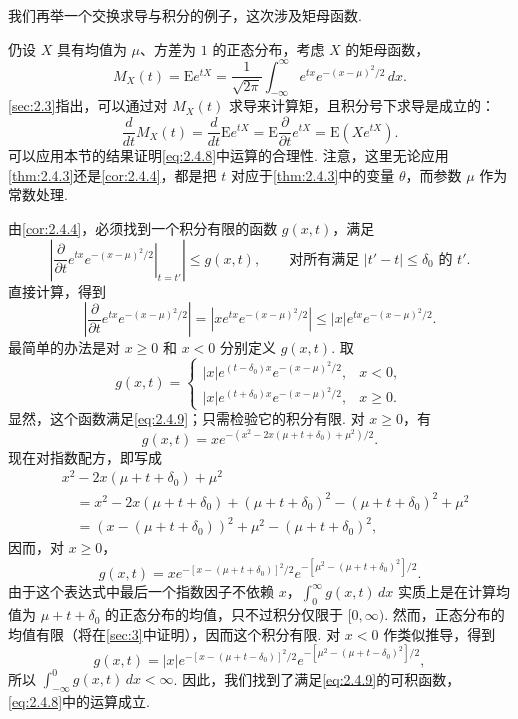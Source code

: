 我们再举一个交换求导与积分的例子，这次涉及矩母函数.
\begin{example}[交换积分与求导——II]\label{ex:2.4.6}
仍设 $X$ 具有均值为 $\mu$、方差为 $1$ 的正态分布，考虑 $X$ 的矩母函数，
$$M_X(t)=\mathrm Ee^{tX}=\frac1{\sqrt{2\pi}}\int_{-\infty}^\infty e^{tx}e^{-(x-\mu)^2/2}\,dx.$$
\autoref{sec:2.3}指出，可以通过对 $M_X(t)$ 求导来计算矩，且积分号下求导是成立的：
\begin{equation}\label{eq:2.4.8}
\frac d{dt}M_X(t)=\frac d{dt}\mathrm Ee^{tX}
=\mathrm E\frac\partial{\partial t}e^{tX}=\mathrm E(Xe^{tX}).
\end{equation}
可以应用本节的结果证明\eqref{eq:2.4.8}中运算的合理性. 注意，这里无论应用\autoref{thm:2.4.3}还是\autoref{cor:2.4.4}，都是把 $t$ 对应于\autoref{thm:2.4.3}中的变量 $\theta$，而参数 $\mu$ 作为常数处理.

由\autoref{cor:2.4.4}，必须找到一个积分有限的函数 $g(x,t)$，满足
\begin{equation}\label{eq:2.4.9}
\left|\left.\frac\partial{\partial t}e^{tx}e^{-(x-\mu)^2/2}\right|_{t=t'}\right|
\le g(x,t),\qquad\text{对所有满足 $|t'-t|\le\delta_0$ 的 $t'$}.
\end{equation}
直接计算，得到
$$\left|\frac\partial{\partial t}e^{tx}e^{-(x-\mu)^2/2}\right|
=\left|xe^{tx}e^{-(x-\mu)^2/2}\right|
\le|x|e^{tx}e^{-(x-\mu)^2/2}.$$
最简单的办法是对 $x\ge0$ 和 $x<0$ 分别定义 $g(x,t)$. 取
$$g(x,t)=\begin{cases}
|x|e^{(t-\delta_0)x}e^{-(x-\mu)^2/2},&x<0,\\
|x|e^{(t+\delta_0)x}e^{-(x-\mu)^2/2},&x\ge0.
\end{cases}$$
显然，这个函数满足\eqref{eq:2.4.9}；只需检验它的积分有限.
对 $x\ge0$，有
$$g(x,t)=xe^{-(x^2-2x(\mu+t+\delta_0)+\mu^2)/2}.$$
现在对指数配方，即写成
$$\begin{aligned}
&x^2-2x(\mu+t+\delta_0)+\mu^2\\
&\quad=x^2-2x(\mu+t+\delta_0)+(\mu+t+\delta_0)^2-(\mu+t+\delta_0)^2+\mu^2\\
&\quad=(x-(\mu+t+\delta_0))^2+\mu^2-(\mu+t+\delta_0)^2,
\end{aligned}$$
因而，对 $x\ge0$，
$$g(x,t)=xe^{-[x-(\mu+t+\delta_0)]^2/2}e^{-[\mu^2-(\mu+t+\delta_0)^2]/2}.$$
由于这个表达式中最后一个指数因子不依赖 $x$，$\int_0^\infty g(x,t)\,dx$ 实质上是在计算均值为 $\mu+t+\delta_0$ 的正态分布的均值，只不过积分仅限于 $[0,\infty)$. 然而，正态分布的均值有限（将在\autoref{sec:3}中证明），因而这个积分有限. 对 $x<0$ 作类似推导，得到
$$g(x,t)=|x|e^{-[x-(\mu+t-\delta_0)]^2/2}e^{-[\mu^2-(\mu+t-\delta_0)^2]/2},$$
所以 $\int_{-\infty}^0g(x,t)\,dx<\infty$. 因此，我们找到了满足\eqref{eq:2.4.9}的可积函数，\eqref{eq:2.4.8}中的运算成立.
\end{example}

